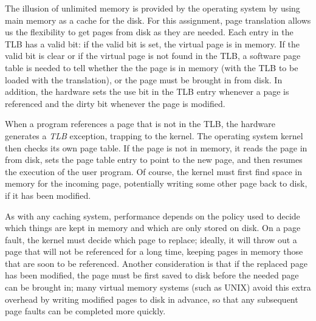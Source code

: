 The illusion of unlimited memory is provided by the operating system
by using main memory as a cache for the disk.  For this assignment,
page translation allows us the flexibility to get pages from disk as
they are needed.  Each entry in the TLB has a valid bit:
if the valid bit is set, the virtual page is in memory.  If the valid bit is
clear or if the virtual page is not found in the TLB, a software page table
is needed to tell whether the the page is in memory (with the TLB to be
loaded with the translation), or the page must be brought in from disk.
In addition, the hardware sets the use bit in the TLB entry whenever
a page is referenced and the dirty bit whenever the page is modified.

When a program references a page that is not in the TLB,
the hardware generates a {\em TLB} exception, trapping to the kernel.
The operating system kernel then checks its own page table.  If the
page is not in memory, it reads the page in from disk,
sets the page table entry to point to the new page, and then resumes
the execution of the user program.  Of course, the kernel must
first find space in memory for the incoming page, potentially
writing some other page back to disk, if it has been modified.

As with any caching system, performance depends on the policy
used to decide which things are kept in memory and which
are only stored on disk.
On a page fault, the kernel must decide which page to replace;
ideally, it will throw out a page that will not be referenced for
a long time, keeping pages in memory those that are soon to be
referenced.  Another consideration is that if the replaced page
has been modified, the page must be first saved to disk before the needed
page can be brought in; many virtual memory systems (such as UNIX)
avoid this extra overhead by writing modified pages to disk in
advance, so that any subsequent page faults can be completed more quickly.

